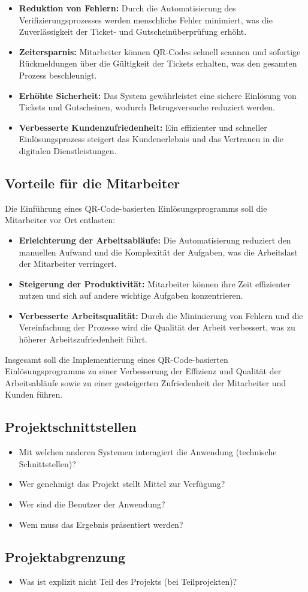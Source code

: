 \begin{itemize}
    \item \textbf{Reduktion von Fehlern:} Durch die Automatisierung des Verifizierungsprozesses werden menschliche Fehler minimiert, was die Zuverlässigkeit der Ticket- und Gutscheinüberprüfung erhöht.
    \item \textbf{Zeitersparnis:} Mitarbeiter können QR-Codes schnell scannen und sofortige Rückmeldungen über die Gültigkeit der Tickets erhalten, was den gesamten Prozess beschleunigt.
    \item \textbf{Erhöhte Sicherheit:} Das System gewährleistet eine sichere Einlösung von Tickets und Gutscheinen, wodurch Betrugsversuche reduziert werden.
    \item \textbf{Verbesserte Kundenzufriedenheit:} Ein effizienter und schneller Einlösungsprozess steigert das Kundenerlebnis und das Vertrauen in die digitalen Dienstleistungen.
\end{itemize}

\subsection{Vorteile für die Mitarbeiter}
Die Einführung eines QR-Code-basierten Einlösungsprogramms soll die Mitarbeiter vor Ort entlasten:

\begin{itemize}
    \item \textbf{Erleichterung der Arbeitsabläufe:} Die Automatisierung reduziert den manuellen Aufwand und die Komplexität der Aufgaben, was die Arbeitslast der Mitarbeiter verringert.
    \item \textbf{Steigerung der Produktivität:} Mitarbeiter können ihre Zeit effizienter nutzen und sich auf andere wichtige Aufgaben konzentrieren.
    \item \textbf{Verbesserte Arbeitsqualität:} Durch die Minimierung von Fehlern und die Vereinfachung der Prozesse wird die Qualität der Arbeit verbessert, was zu höherer Arbeitszufriedenheit führt.
\end{itemize}

Insgesamt soll die Implementierung eines QR-Code-basierten Einlösungsprogramms zu einer Verbesserung der Effizienz und Qualität der Arbeitsabläufe sowie zu einer gesteigerten Zufriedenheit der Mitarbeiter und Kunden führen.

\subsection{Projektschnittstellen} 
\label{sec:Projektschnittstellen}
\begin{itemize}
	\item Mit welchen anderen Systemen interagiert die Anwendung (technische Schnittstellen)?
	\item Wer genehmigt das Projekt \bzw stellt Mittel zur Verfügung? 
	\item Wer sind die Benutzer der Anwendung?
	\item Wem muss das Ergebnis präsentiert werden?
\end{itemize}


\subsection{Projektabgrenzung} 
\label{sec:Projektabgrenzung}
\begin{itemize}
	\item Was ist explizit nicht Teil des Projekts (\insb bei Teilprojekten)?
\end{itemize}
